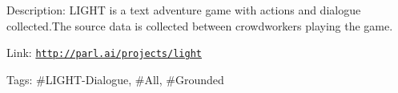 Description\+: L\+I\+G\+HT is a text adventure game with actions and dialogue collected.\+The source data is collected between crowdworkers playing the game.

Link\+: \href{http://parl.ai/projects/light}{\tt http\+://parl.\+ai/projects/light}

Tags\+: \#\+L\+I\+G\+HT-\/\+Dialogue, \#\+All, \#\+Grounded 